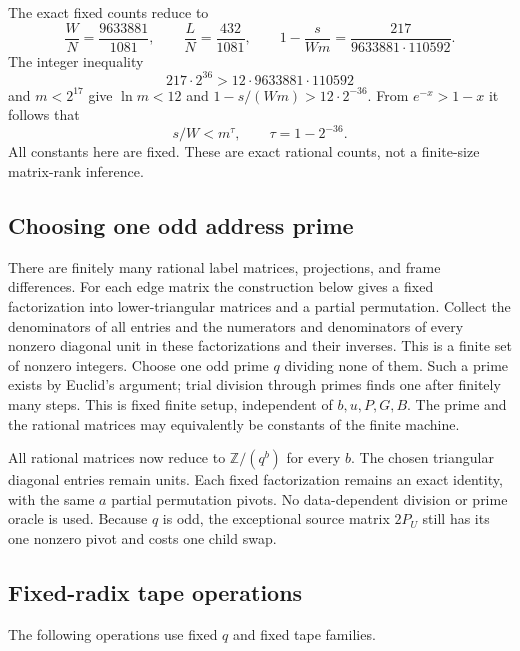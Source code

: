 The exact fixed counts reduce to
\[
 \frac WN=\frac{9633881}{1081},\qquad
 \frac LN=\frac{432}{1081},\qquad
 1-\frac{s}{Wm}=\frac{217}{9633881\cdot110592}.
\]
The integer inequality
\[
 217\cdot2^{36}>12\cdot9633881\cdot110592
\]
and $m<2^{17}$ give $\ln m<12$ and
$1-s/(Wm)>12\cdot2^{-36}$.  From $e^{-x}>1-x$ it follows that
\[
                      s/W<m^\tau,\qquad \tau=1-2^{-36}.
\]
All constants here are fixed.  These are exact rational counts, not a
finite-size matrix-rank inference.

\subsection{Choosing one odd address prime}

There are finitely many rational label matrices, projections, and frame
differences.  For each edge matrix the construction below gives a fixed
factorization into lower-triangular matrices and a partial permutation.
Collect the denominators of all entries and the numerators and
denominators of every nonzero diagonal unit in these factorizations and
their inverses.  This is a finite set of nonzero integers.  Choose one
odd prime $q$ dividing none of them.  Such a prime exists by Euclid's
argument; trial division through primes finds one after finitely many
steps.  This is fixed finite setup, independent of $b,u,P,G,B$.  The
prime and the rational matrices may equivalently be constants of the
finite machine.

All rational matrices now reduce to $\mathbb Z/(q^b)$ for every $b$.
The chosen triangular diagonal entries remain units.  Each fixed
factorization remains an exact identity, with the same $a$ partial
permutation pivots.  No data-dependent division or prime oracle is used.
Because $q$ is odd, the exceptional source matrix $2P_U$ still has its
one nonzero pivot and costs one child swap.

\subsection{Fixed-radix tape operations}

The following operations use fixed $q$ and fixed tape families.

